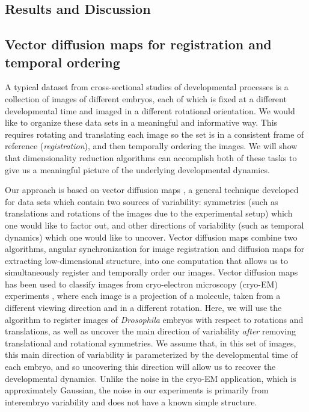 \documentclass{pnastwo}
\begin{document}
\begin{article}
\section{Results and Discussion}

\subsection{Vector diffusion maps for registration and temporal ordering}

A typical dataset from cross-sectional studies of developmental processes is a collection of images of different embryos, each of which is fixed at a different developmental time and imaged in a different rotational orientation.
%
We would like to organize these data sets in a meaningful and informative way.
%
This requires rotating and translating each image so the set is in a consistent frame of reference ({\it registration}), and then temporally ordering the images. 
%
We will show that dimensionality reduction algorithms can accomplish both of these tasks to give us a meaningful picture of the underlying developmental dynamics. 

Our approach is based on vector diffusion maps \cite{singer2012vector}, a general technique developed for data sets which contain two sources of variability:
symmetries (such as translations and rotations of the images due to the experimental setup) which one would like to factor out, and other directions of variability (such as temporal dynamics) which one would like to uncover.
%
Vector diffusion maps combine two algorithms, angular synchronization \cite{singer2011angular} for image registration and diffusion maps \cite{coifman2005geometric} for extracting low-dimensional structure, into one computation that allows us to simultaneously register and temporally order our images. 
%
Vector diffusion maps has been used to classify images from cryo-electron microscopy (cryo-EM) experiments \cite{...}, where each image is a projection of a molecule, taken from a different viewing direction and in a different rotation. 
%
Here, we will use the algorithm to register images of {\it Drosophila} embryos with respect to rotations and translations, as well as uncover the main direction of variability {\it after} removing translational and rotational symmetries.
%
We assume that, in this set of images, this main direction of variability is parameterized by the developmental time of each embryo, and so uncovering this direction will allow us to recover the developmental dynamics. 
%
Unlike the noise in the cryo-EM application, which is approximately Gaussian, the noise in our experiments is primarily from interembryo variability and does not have a known simple structure.


\end{article}
\end{document}

